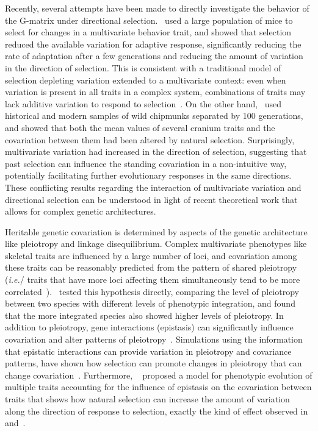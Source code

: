 \begin{refsection}
Recently, several attempts have been made to directly investigate the
behavior of the G-matrix under directional selection.~\textcite{Careau2015-sy} used a
large population of mice to select for changes in a multivariate
behavior trait, and showed that selection reduced the available
variation for adaptive response, significantly reducing the rate of
adaptation after a few generations and reducing the amount of variation
in the direction of selection. This is consistent with a traditional
model of selection depleting variation extended to a multivariate
context: even when variation is present in all traits in a complex
system, combinations of traits may lack additive variation to respond to
selection~\parencite{Hine2011-ks}. On the other hand,~\textcite{Assis2016-vz} used historical
and modern samples of wild chipmunks separated by 100 generations, and
showed that both the mean values of several cranium traits and the
covariation between them had been altered by natural selection.
Surprisingly, multivariate variation had increased in the direction of
selection, suggesting that past selection can influence the standing
covariation in a non-intuitive way, potentially facilitating further
evolutionary responses in the same directions. These conflicting results
regarding the interaction of multivariate variation and directional
selection can be understood in light of recent theoretical work that
allows for complex genetic architectures.

Heritable genetic covariation is determined by aspects of the genetic
architecture like pleiotropy and linkage disequilibrium. Complex
multivariate phenotypes like skeletal traits are influenced by a large
number of loci, and covariation among these traits can be reasonably
predicted from the pattern of shared pleiotropy (\emph{i.e.}/ traits
that have more loci affecting them simultaneously tend to be more
correlated~\parencite{Kenney-Hunt2008-bd}).~\textcite{Porto2016-qc} tested this hypothesis
directly, comparing the level of pleiotropy between two species with
different levels of phenotypic integration, and found that the more
integrated species also showed higher levels of pleiotropy. In addition
to pleiotropy, gene interactions (epistasis) can significantly influence
covariation and alter patterns of
pleiotropy~\parencite{Wolf2005-nr, Wolf2006-xt, Pavlicev2008-jy}. Simulations using
the information that epistatic interactions can provide variation in
pleiotropy and covariance patterns, have shown how selection can promote
changes in pleiotropy that can change
covariation~\parencite{Jones2014-wj, Melo2015-bk}. Furthermore, ~\textcite{Pavlicev2011-wz}
proposed a model for phenotypic evolution of multiple traits accounting
for the influence of epistasis on the covariation between traits that
shows how natural selection can increase the amount of variation along
the direction of response to selection, exactly the kind of effect
observed in~\textcite{Assis2016-vz} and~\textcite{Roff2012-fe}.


\end{refsection}

